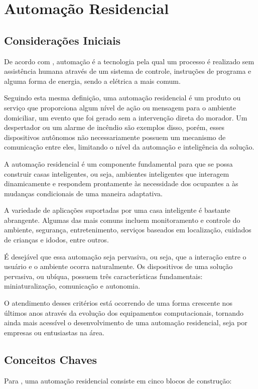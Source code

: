 \chapter {Automação Residencial}
\label{cap:1}

\section {Considerações Iniciais}
De acordo com , automação é a tecnologia pela qual um processo é realizado
sem assistência humana através de um sistema de controle, instruções de programa e alguma forma de energia,
sendo a elétrica a mais comum.

Seguindo esta mesma definição, uma automação residencial é um produto ou serviço que proporciona algum nível de
ação ou mensagem para o ambiente domiciliar, um evento que foi gerado sem a intervenção direta do morador. Um
despertador ou um alarme de incêndio são exemplos disso, porém, esses dispositivos autônomos não
necessariamente possuem um mecanismo de comunicação entre eles, limitando o nível da automação e inteligência
da solução. \cite{riley2012}

A automação residencial é um componente fundamental para que se possa construir casas inteligentes, ou seja,
ambientes inteligentes que interagem dinamicamente e respondem prontamente às necessidade dos ocupantes a às
mudanças condicionais de uma maneira adaptativa. \cite{al-qutayri2010}

A variedade de aplicações suportadas por uma casa inteligente é bastante abrangente. Algumas das mais comuns incluem
monitoramento e controle do ambiente, segurança, entretenimento, serviços baseados em localização, cuidados
de crianças e idodos, entre outros. \cite{al-qutayri2010}

É desejável que essa automação seja pervasiva, ou seja, que a interação entre o usuário e o ambiente ocorra
naturalmente. Os dispositivos de uma solução pervasiva, ou ubíqua, possuem três características fundamentais:
miniaturalização, comunicação e autonomia. \cite{lalanda2010}

O atendimento desses critérios está ocorrendo de uma forma crescente nos últimos anos através da evolução dos
equipamentos computacionais, tornando ainda mais acessível o desenvolvimento de uma automação residencial,
seja por empresas ou entusiastas na área.

\section{Conceitos Chaves}
Para , uma automação residencial consiste em cinco blocos de construção:


